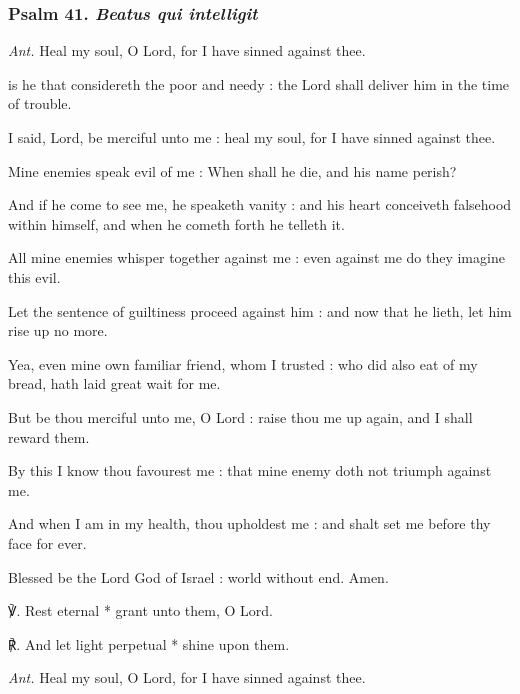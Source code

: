 \subsubsection{Psalm 41. \textit{Beatus qui intelligit}}\par\noindent
\textit{Ant.} Heal my soul, {\dag} O Lord, for I have sinned against thee.\par
{} is he that considereth the poor and needy : the Lord shall deliver him in the time of trouble.\par
{}
I said, Lord, be merciful unto me : heal my soul, for I have sinned against thee.\par
{}Mine enemies speak evil of me : When shall he die, and his name perish?\par
{}And if he come to see me, he speaketh vanity : and his heart conceiveth falsehood within himself, and when he cometh forth he telleth it.\par
{}All mine enemies whisper together against me : even against me do they imagine this evil.\par
{}Let the sentence of guiltiness proceed against him : and now that he lieth, let him rise up no more.\par
{}Yea, even mine own familiar friend, whom I trusted : who did also eat of my bread, hath laid great wait for me.\par
{}But be thou merciful unto me, O Lord : raise thou me up again, and I shall reward them.\par
{}By this I know thou favourest me : that mine enemy doth not triumph against me.\par
{}And when I am in my health, thou upholdest me : and shalt set me before thy face for ever.\par
{}Blessed be the Lord God of Israel : world without end. Amen.\par
℣. Rest eternal * grant unto them, O Lord.\par
℟. And let light perpetual * shine upon them.\par\noindent
\textit{Ant.} Heal my soul, O Lord, for I have sinned against thee.\par

